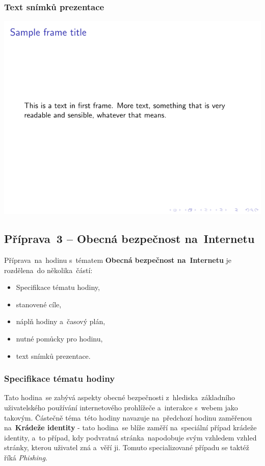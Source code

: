 \documentclass[a4paper, 12pt]{article}
\begin{document}
\subsubsection{Text snímků prezentace}
\includegraphics{IdentityTheftSlides/xdusek21-IdentityTheft.pdf}


\subsection{Příprava~3 -- Obecná bezpečnost na~Internetu}
Příprava~na~hodinu s~tématem \textbf{Obecná bezpečnost na~Internetu} je rozdělena~do několika~částí:
\begin{itemize}
        \setlength{\itemsep}{-3pt}
        \item Specifikace tématu hodiny,
        \item stanovené cíle,
        \item náplň hodiny a~časový plán,
        \item nutné pomůcky pro hodinu,
        \item text snímků prezentace.
\end{itemize}

\subsubsection{Specifikace tématu hodiny}
Tato hodina~se zabývá aspekty obecné bezpečnosti z~hlediska~základního uživatelského používání internetového prohlížeče a~interakce s~webem jako takovým. Částečně téma~této hodiny navazuje na~předchozí hodinu zaměřenou na~\textbf{Krádeže identity} - tato hodina~se blíže zaměří na~speciální případ krádeže identity, a~to případ, kdy podvratná stránka~napodobuje svým vzhledem vzhled stránky, kterou uživatel zná a~věří ji. Tomuto specializované případu se taktéž říká \textit{Phishing}.
\end{document}
